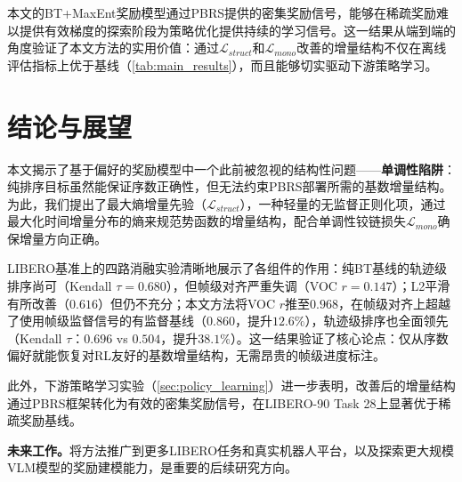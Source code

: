 本文的BT+MaxEnt奖励模型通过PBRS提供的密集奖励信号，能够在稀疏奖励难以提供有效梯度的探索阶段为策略优化提供持续的学习信号。这一结果从端到端的角度验证了本文方法的实用价值：通过$\mathcal{L}_{struct}$和$\mathcal{L}_{mono}$改善的增量结构不仅在离线评估指标上优于基线（\cref{tab:main_results}），而且能够切实驱动下游策略学习。


\clearpage


\section{结论与展望}
\label{sec:conclusion}

本文揭示了基于偏好的奖励模型中一个此前被忽视的结构性问题——\textbf{单调性陷阱}：纯排序目标虽然能保证序数正确性，但无法约束PBRS部署所需的基数增量结构。为此，我们提出了最大熵增量先验（$\mathcal{L}_{struct}$），一种轻量的无监督正则化项，通过最大化时间增量分布的熵来规范势函数的增量结构，配合单调性铰链损失$\mathcal{L}_{mono}$确保增量方向正确。

LIBERO基准上的四路消融实验清晰地展示了各组件的作用：纯BT基线的轨迹级排序尚可（Kendall $\tau = 0.680$），但帧级对齐严重失调（VOC $r = 0.147$）；L2平滑有所改善（$0.616$）但仍不充分；本文方法将VOC $r$推至$0.968$，在帧级对齐上超越了使用帧级监督信号的有监督基线（$0.860$，提升$12.6\%$），轨迹级排序也全面领先（Kendall $\tau$：$0.696$ vs $0.504$，提升$38.1\%$）。这一结果验证了核心论点：仅从序数偏好就能恢复对RL友好的基数增量结构，无需昂贵的帧级进度标注。

此外，下游策略学习实验（\cref{sec:policy_learning}）进一步表明，改善后的增量结构通过PBRS框架转化为有效的密集奖励信号，在LIBERO-90 Task 28上显著优于稀疏奖励基线。

\textbf{未来工作。}将方法推广到更多LIBERO任务和真实机器人平台，以及探索更大规模VLM模型的奖励建模能力，是重要的后续研究方向。



